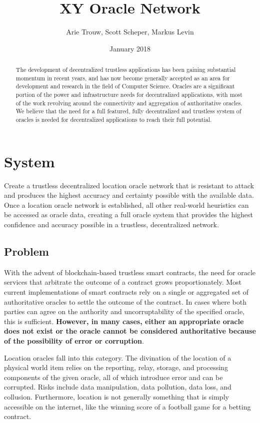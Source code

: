 \documentclass{article}
\title {XY Oracle Network}
\author{Arie Trouw, Scott Scheper, Markus Levin}
\date{January 2018}
\begin{document}
\maketitle
\tableofcontents

\begin{abstract}
The development of decentralized trustless applications has been gaining substantial momentum in recent years, and has now become generally accepted as an area for development and research in the field of Computer Science.  Oracles are a significant portion of the power and infrastructure needs for decentralized applications, with most of the work revolving around the connectivity and aggregation of authoritative oracles.  We believe that the need for a full featured, fully decentralized and trustless system of oracles is needed for decentralized applications to reach their full potential.
\end{abstract}

\section {System}
Create a trustless decentralized location oracle network that is resistant to attack and produces the highest \gls{accuracy} and \gls{certainty} possible with the available data.  Once a location oracle network is established, all other real-world \glspl{heuristic} can be accessed as oracle data, creating a full \gls{oracle} system that provides the highest confidence and accuracy possible in a trustless, decentralized network.

\subsection {Problem}
With the advent of blockchain-based trustless smart contracts, the need for oracle services that arbitrate the outcome of a contract grows proportionately.  Most current implementations of smart contracts rely on a single or aggregated set of authoritative oracles to settle the outcome of the contract.  In cases where both parties can agree on the authority and uncorruptability of the specified oracle, this is sufficient.  \textbf{However, in many cases, either an appropriate oracle does not exist or the oracle cannot be considered authoritative because of the possibility of error or corruption}.
 
Location oracles fall into this category.  The divination of the location of a physical world item relies on the reporting, relay, storage, and processing components of the given oracle, all of which introduce error and can be corrupted.  Risks include data manipulation, data pollution, data loss, and collusion.  Furthermore, location is not generally something that is simply accessible on the internet, like the winning score of a football game for a betting contract.
\end{document}
